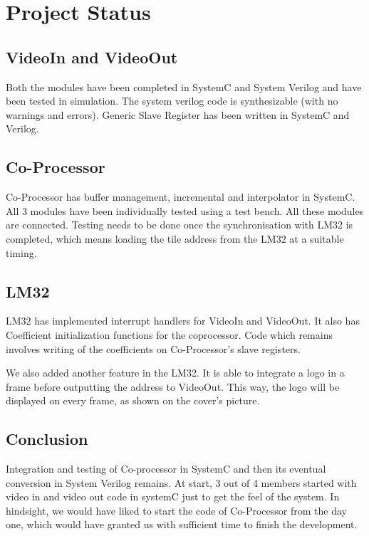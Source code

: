 

\section{Project Status}

\subsection{VideoIn and VideoOut}
Both the modules have been completed in SystemC and System Verilog and have been tested in simulation. The system verilog code is synthesizable (with no warnings and errors). Generic Slave Register has been written in SystemC and Verilog. 

\subsection{Co-Processor}
Co-Processor has buffer management, incremental and interpolator in SystemC. All 3 modules have been individually tested using a test bench. All these modules are connected. Testing needs to be done once the synchronisation with LM32 is completed, which means loading the tile address from the LM32 at a suitable timing. 

\subsection{LM32}
LM32 has implemented interrupt handlers for VideoIn and VideoOut. It also has Coefficient initialization functions for the coprocessor. Code which remains involves writing of the coefficients on Co-Processor's slave registers.

We also added another feature in the LM32. It is able to integrate a logo in a frame before outputting the address to VideoOut. This way, the logo will be displayed on every frame, as shown on the cover's picture.

\subsection{Conclusion}
Integration and testing of Co-processor in SystemC and then its eventual conversion in System Verilog remains. At start, 3 out of 4 members started with video in and video out code in systemC just to get the feel of the system. In hindsight, we would have liked to start the code of Co-Processor from the day one, which would have granted us with sufficient time to finish the development.


